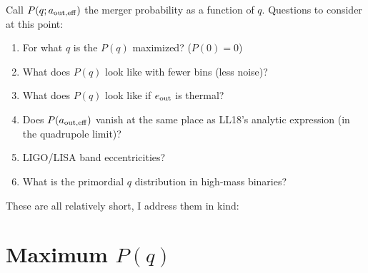 \documentclass[11pt,
        usenames, %
        dvipsnames %
    ]{article}
\begin{document}
\onehalfspacing

\pagestyle{fancy}
\rhead{}
\cfoot{\thepage/\pageref{LastPage}}

Call $P(q; a_{\rm out, eff})$ the merger probability as a function of $q$.
Questions to consider at this point:
\begin{enumerate}[(1)]
    \item For what $q$ is the $P(q)$ maximized? ($P(0) = 0$)

    \item What does $P(q)$ look like with fewer bins (less noise)?

    \item What does $P(q)$ look like if $e_{\rm out}$ is thermal?

    \item Does $P(a_{\rm out, eff})$ vanish at the same place as LL18's
        analytic expression (in the quadrupole limit)?

    \item LIGO/LISA band eccentricities?

    \item What is the primordial $q$ distribution in high-mass binaries?
\end{enumerate}

These are all relatively short, I address them in kind:

\section{Maximum $P(q)$}
\end{document}
